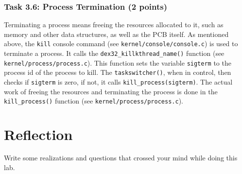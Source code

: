 \documentclass[a4paper, 11pt,oneside]{article}
\begin{document}
\subsubsection*{Task 3.6: Process Termination (2 points)} 

Terminating a process means freeing the resources allocated to it,  such as memory and other data structures, as well as the PCB itself. As mentioned above, the \texttt{kill} console command (see \texttt{kernel/console/console.c}) is used to terminate a process. It calls the 
\texttt{dex32\_killkthread\_name()} function (see \texttt{kernel/process/process.c}). This function sets 
the  variable \texttt{sigterm} to the process id of the process to kill. The \texttt{taskswitcher()}, when in control, then checks if \texttt{sigterm} is zero, if not, it calls \texttt{kill\_process(sigterm)}. 
The actual work of freeing the resources and terminating the process is done in the \texttt{kill\_process()} function (see \texttt{kernel/process/process.c}).

\noindent{}

\section{Reflection}
Write some realizations and questions that crossed your mind while doing this 
lab. 
\end{document}
